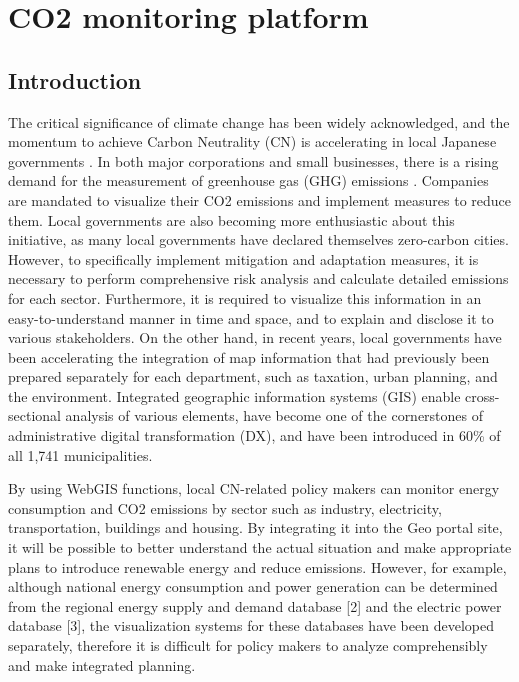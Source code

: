 \chapter{CO2 monitoring platform}
\renewcommand{\headrulewidth}{0pt}
\lhead[\thepage]{\leftmark}
\rhead[\leftmark]{\thepage}
\cfoot[]{}

\section{Introduction}
The critical significance of climate change has been widely acknowledged, and the momentum to achieve Carbon Neutrality (CN) is accelerating in local Japanese governments \citep{nakazawa2023net}. In both major corporations and small businesses, there is a rising demand for the measurement of greenhouse gas (GHG) emissions \citep{kauffmann2012corporate}. Companies are mandated to visualize their CO2 emissions and implement measures to reduce them. Local governments are also becoming more enthusiastic about this initiative, as many local governments have declared themselves zero-carbon cities. However, to specifically implement mitigation and adaptation measures, it is necessary to perform comprehensive risk analysis and calculate detailed emissions for each sector. Furthermore, it is required to visualize this information in an easy-to-understand manner in time and space, and to explain and disclose it to various stakeholders. On the other hand, in recent years, local governments have been accelerating the integration of map information that had previously been prepared separately for each department, such as taxation, urban planning, and the environment. Integrated geographic information systems (GIS) enable cross-sectional analysis of various elements, have become one of the cornerstones of administrative digital transformation (DX), and have been introduced in 60\% of all 1,741 municipalities.\par

By using WebGIS functions, local CN-related policy makers can monitor energy consumption and CO2 emissions by sector such as industry, electricity, transportation, buildings and housing. By integrating it into the Geo portal site, it will be possible to better understand the actual situation and make appropriate plans to introduce renewable energy and reduce emissions. However, for example, although national energy consumption and power generation can be determined from the regional energy supply and demand database [2] and the electric power database [3], the visualization systems for these databases have been developed separately, therefore it is difficult for policy makers to analyze comprehensibly and make integrated planning.\par

